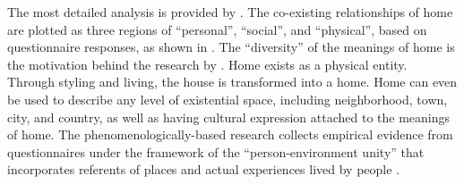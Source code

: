 The most detailed analysis is provided by \textcite{sixsmith1986meaning}. The co-existing relationships of home are plotted as three regions of ``personal'', ``social'', and ``physical'', based on questionnaire responses, as shown in . The ``diversity'' of the meanings of home is the motivation behind the research by \textcite{sixsmith1986meaning}. Home exists as a physical entity. Through styling and living, the house is transformed into a home. Home can even be used to describe any level of existential space, including neighborhood, town, city, and country, as well as having cultural expression attached to the meanings of home. The phenomenologically-based research collects empirical evidence from questionnaires under the framework of the ``person-environment unity'' that incorporates referents of places and actual experiences lived by people \parencite{sixsmith1986meaning}.

